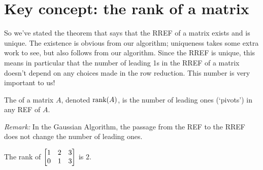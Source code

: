 \section{Key concept: the rank of a matrix}

So we've stated the theorem that says that the RREF of a matrix exists and
is
unique.  The existence is obvious from our algorithm; uniqueness takes
some extra work to see, but also follows from our algorithm.  Since 
the RREF is unique, this means in particular that the number of leading
1s in the RREF of a matrix doesn't depend on any choices made in
the row reduction.  This number is very important to us!
 
\begin{definition}  The  of a matrix $A$, denoted $\textrm{rank}(A)$, is the number of leading ones (`pivots') in any REF of $A$.
\end{definition}

\emph{Remark:} In the Gaussian Algorithm, the passage from the REF to the RREF does not change the number of leading ones.

\begin{myexample} The rank of $\left[ \begin{matrix} 1 & 2  & 3\\ 0 & 1  &3 \end{matrix} \right]$ is $2$.\end{myexample}

 
